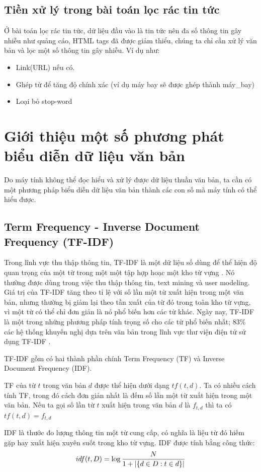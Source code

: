 \subsection{Tiền xử lý trong bài toán lọc rác tin tức}
  Ở bài toán lọc rác tin tức, dữ liệu đầu vào là tin tức nên đa số thông tin gây nhiễu như quảng cáo, HTML tags đã được giảm thiểu, chúng ta chỉ cần xử lý văn bản và lọc một số thông tin gây nhiễu. Ví dụ như:
  \begin{itemize}
    \item Link(URL) nếu có.
    \item Ghép từ để tăng độ chính xác (ví dụ máy bay sẽ được ghép thành máy\_bay)
    \item Loại bỏ stop-word
  \end{itemize}
\section{Giới thiệu một số phương phát biểu diễn dữ liệu văn bản} \label{distances}
Do máy tính không thể đọc hiểu và xử lý được dữ liệu thuần văn bản, ta cần có một phương pháp biểu diễn dữ liệu văn bản thành các con số mà máy tính có thể hiểu được.
\subsection*{Term Frequency - Inverse Document Frequency (TF-IDF)}
Trong lĩnh vực thu thập thông tin, TF-IDF là một dữ liệu số dùng để thể hiện độ quan trọng của một từ trong một một tập hợp hoạc một kho từ vựng \cite{rajaraman_ullman_2011}. Nó thường được dùng trong việc thu thập thông tin, text mining và user modeling. Giá trị của TF-IDF tăng theo tỉ lệ với số lần một từ xuất hiện trong một văn bản, nhưng thường bị giảm lại theo tần xuất của từ đó trong toàn kho từ vựng, vì một từ có thể chỉ đơn giản là nó phổ biến hơn các từ khác. Ngày nay, TF-IDF là một trong những phương pháp tính trọng số cho các từ phổ biến nhất; 83\% các hệ thống khuyến nghị dựa trên văn bản trong lĩnh vực thư viện điện tử sử dụng TF-IDF \cite{Beel2016}.

TF-IDF gồm có hai thành phần chính Term Frequency (TF) và Inverse Document Frequency (IDF).

TF của từ $t$ trong văn bản $d$ được thể hiện dưới dạng $tf(t,d)$. Ta có nhiều cách tính TF, trong đó cách đơn giản nhất là đếm số lần một từ xuất hiện trong một văn bản. Nếu ta gọi số lần từ $t$ xuất hiện trong văn bản $d$ là $f_{t,d}$ thì ta có $tf(t,d) = f_{t,d}$

IDF là thước đo lượng thông tin một từ cung cấp, có nghĩa là liệu từ đó hiếm gặp hay xuất hiện xuyên suốt trong kho từ vựng. IDF được tính bằng công thức:
\begin{equation}
  idf(t, D) = \log\frac{N}{1 + \abs{\{d \in D: t \in d\}}}
\end{equation}

